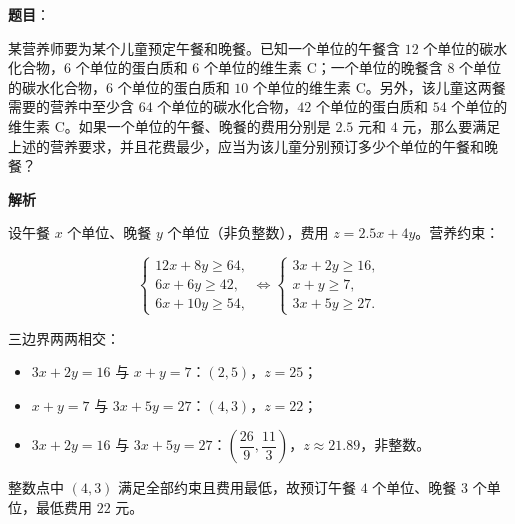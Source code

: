 \begin{answer}

\textbf{题目}：

某营养师要为某个儿童预定午餐和晚餐。已知一个单位的午餐含 $12$ 个单位的碳水化合物，$6$ 个单位的蛋白质和 $6$ 个单位的维生素 C；一个单位的晚餐含 $8$ 个单位的碳水化合物，$6$ 个单位的蛋白质和 $10$ 个单位的维生素 C。另外，该儿童这两餐需要的营养中至少含 $64$ 个单位的碳水化合物，$42$ 个单位的蛋白质和 $54$ 个单位的维生素 C。如果一个单位的午餐、晚餐的费用分别是 $2.5$ 元和 $4$ 元，那么要满足上述的营养要求，并且花费最少，应当为该儿童分别预订多少个单位的午餐和晚餐？

\textbf{解析}

设午餐 $x$ 个单位、晚餐 $y$ 个单位（非负整数），费用 $z=2.5x+4y$。营养约束：

\nopagebreak[4]
\[\begin{cases}
12x+8y\geqslant64,\\
6x+6y\geqslant42,\\
6x+10y\geqslant54,
\end{cases}
\iff
\begin{cases}
3x+2y\geqslant16,\\
x+y\geqslant7,\\
3x+5y\geqslant27.
\end{cases}\]

三边界两两相交：

\begin{itemize}
\item $3x+2y=16$ 与 $x+y=7$：$(2,5)$，$z=25$；
\item $x+y=7$ 与 $3x+5y=27$：$(4,3)$，$z=22$；
\item $3x+2y=16$ 与 $3x+5y=27$：$\left(\dfrac{26}9,\dfrac{11}3\right)$，$z\approx21.89$，非整数。
\end{itemize}

整数点中 $(4,3)$ 满足全部约束且费用最低，故预订午餐 $4$ 个单位、晚餐 $3$ 个单位，最低费用 $22$ 元。


\end{answer}
